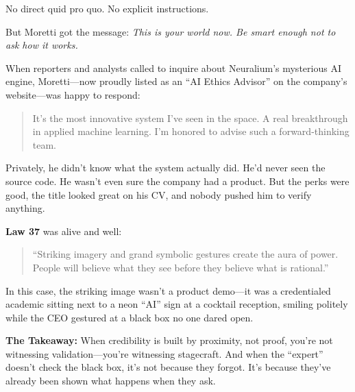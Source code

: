 No direct quid pro quo.  
No explicit instructions.

But Moretti got the message:  
\textit{This is your world now. Be smart enough not to ask how it works.}

When reporters and analysts called to inquire about Neuralium’s mysterious AI engine, Moretti—now proudly listed as an “AI Ethics Advisor” on the company’s website—was happy to respond:
\begin{quote}
It’s the most innovative system I’ve seen in the space. A real breakthrough in applied machine learning. I’m honored to advise such a forward-thinking team.
\end{quote}

Privately, he didn’t know what the system actually did. He’d never seen the source code. He wasn’t even sure the company had a product. But the perks were good, the title looked great on his CV, and nobody pushed him to verify anything.

\medskip

\textbf{Law 37} was alive and well:
\begin{quote}
“Striking imagery and grand symbolic gestures create the aura of power. People will believe what they see before they believe what is rational.”
\end{quote}

In this case, the striking image wasn’t a product demo—it was a credentialed academic sitting next to a neon “AI” sign at a cocktail reception, smiling politely while the CEO gestured at a black box no one dared open.

\medskip

\textbf{The Takeaway:}  
When credibility is built by proximity, not proof, you’re not witnessing validation—you’re witnessing stagecraft.  
And when the “expert” doesn’t check the black box, it’s not because they forgot. It’s because they’ve already been shown what happens when they ask.
